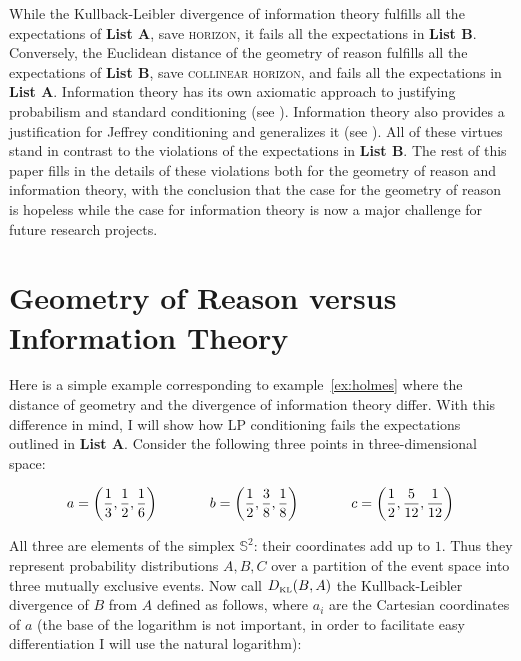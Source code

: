 \documentclass[12pt]{article}
\begin{document}
While the Kullback-Leibler divergence of information theory fulfills
all the expectations of \textbf{List A}, save \textsc{horizon}, it
fails all the expectations in \textbf{List B}. Conversely, the
Euclidean distance of the geometry of reason fulfills all the
expectations of \textbf{List B}, save \textsc{collinear horizon}, and
fails all the expectations in \textbf{List A}. Information theory has
its own axiomatic approach to justifying probabilism and standard
conditioning (see ). Information theory
also provides a justification for Jeffrey conditioning and generalizes
it (see ). All of these virtues stand in contrast
to the violations of the expectations in \textbf{List B}. The rest of
this paper fills in the details of these violations both for the
geometry of reason and information theory, with the conclusion that
the case for the geometry of reason is hopeless while the case for
information theory is now a major challenge for future research
projects.

\section{Geometry of Reason versus Information Theory}
\label{grit}

Here is a simple example corresponding to example~\ref{ex:holmes}
where the distance of geometry and the divergence of information
theory differ. With this difference in mind, I will show how LP
conditioning fails the expectations outlined in \textbf{List A}.
Consider the following three points in three-dimensional space:

\begin{equation}
  \label{eq:e6}
    a=\left(\frac{1}{3},\frac{1}{2},\frac{1}{6}\right) \hspace{.5in}
    b=\left(\frac{1}{2},\frac{3}{8},\frac{1}{8}\right)  \hspace{.5in}
    c=\left(\frac{1}{2},\frac{5}{12},\frac{1}{12}\right)
\end{equation}

All three are elements of the simplex $\mathbb{S}^{2}$: their
coordinates add up to $1$. Thus they represent probability
distributions $A,B,C$ over a partition of the event space into three
mutually exclusive events. Now call $D_{\mbox{\tiny KL}}(B,A)$ the
Kullback-Leibler divergence of $B$ from $A$ defined as follows, where
$a_{i}$ are the Cartesian coordinates of $a$ (the base of the
logarithm is not important, in order to facilitate easy
differentiation I will use the natural logarithm):
\end{document}
